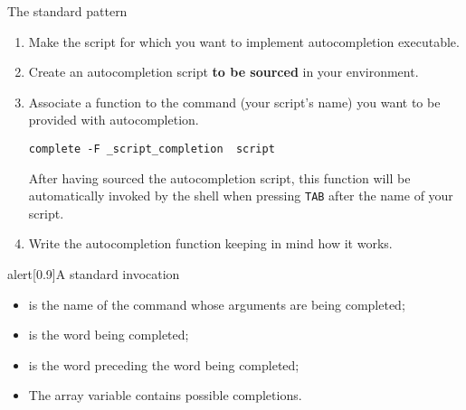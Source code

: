 \begin{frame}[fragile]{The standard pattern}
    \vspace{-3mm}
    \begin{enumerate}
        \item Make the script for which you want to implement autocompletion executable.
        \item Create an autocompletion script \textbf{to be sourced} in your environment.
        \item Associate a function to the command (your script's name) you want to be provided with autocompletion.
              \begin{lstlisting}[style=myBash, numbers=none, aboveskip=3mm, belowskip=-5mm, xrightmargin=15mm]
                  complete -F _script_completion  script
              \end{lstlisting}
              After having sourced the autocompletion script, this function will be automatically invoked by the shell when pressing \texttt{TAB} after the name of your script.
        \item Write the autocompletion function keeping in mind how it works.
    \end{enumerate}
    \begin{varblock}{alert}[0.9\textwidth]{A standard invocation}
        \begin{itemize}
            \item {} is the name of the command whose arguments are being completed;
            \item {} is the word being completed;
            \item {} is the word preceding the word being completed;
            \item The array variable  contains possible completions.
        \end{itemize}
    \end{varblock}
\end{frame}

